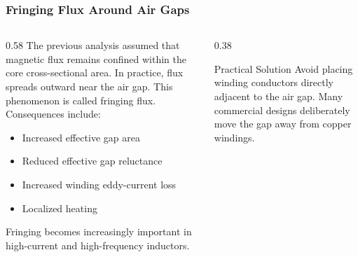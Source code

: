 \begin{frame} 
    \frametitle{Fringing Flux Around Air Gaps} 
    \begin{columns} 
        \begin{column}{0.58\textwidth} 
            The previous analysis assumed that magnetic flux remains confined within the core cross-sectional area.
            \vspace{0.15cm} In practice, flux spreads outward near the air gap. 
            \vspace{0.15cm} This phenomenon is called fringing flux. 
            \vspace{0.15cm} Consequences include:
            \begin{itemize} 
                \item Increased effective gap area 
                \item Reduced effective gap reluctance 
                \item Increased winding eddy-current loss 
                \item Localized heating 
            \end{itemize} 
            \vspace{0.15cm} Fringing becomes increasingly important in high-current and high-frequency inductors. 
        \end{column} 
        \begin{column}{0.38\textwidth} 
            \begin{block}{Practical Solution} 
                Avoid placing winding conductors directly adjacent to the air gap. 
                \vspace{0.15cm} Many commercial designs deliberately move the gap away from copper windings. 
            \end{block} 
        \end{column} 
    \end{columns} 
\end{frame}


